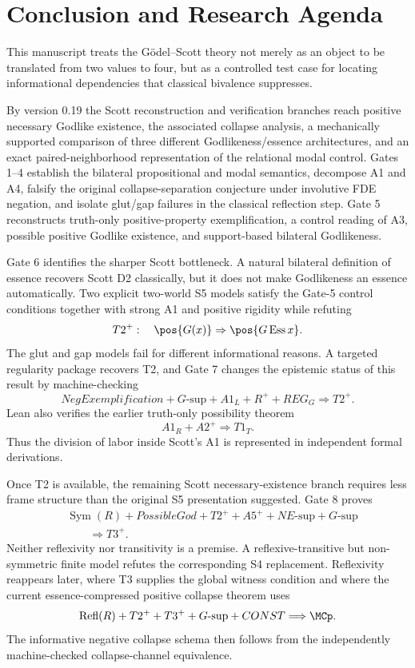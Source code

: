 \section{Conclusion and Research Agenda}
\label{sec:conclusion}

This manuscript treats the G\"odel--Scott theory not merely as an object to be translated from two values to four, but as a controlled test case for locating informational dependencies that classical bivalence suppresses.

By version 0.19 the Scott reconstruction and verification branches reach positive necessary Godlike existence, the associated collapse analysis, a mechanically supported comparison of three different Godlikeness/essence architectures, and an exact paired-neighborhood representation of the relational modal control. Gates 1--4 establish the bilateral propositional and modal semantics, decompose A1 and A4, falsify the original collapse-separation conjecture under involutive FDE negation, and isolate glut/gap failures in the classical reflection step. Gate 5 reconstructs truth-only positive-property exemplification, a control reading of A3, possible positive Godlike existence, and support-based bilateral Godlikeness.

Gate 6 identifies the sharper Scott bottleneck. A natural bilateral definition of essence recovers Scott D2 classically, but it does not make Godlikeness an essence automatically. Two explicit two-world S5 models satisfy the Gate-5 control conditions together with strong A1 and positive rigidity while refuting
\[
  T2^+:\quad
  \pos{G(x)}\Rightarrow\pos{G\operatorname{Ess}x}.
\]
The glut and gap models fail for different informational reasons. A targeted regularity package recovers T2, and Gate 7 changes the epistemic status of this result by machine-checking
\[
  NegExemplification
  +G\text{-sup}
  +A1_L
  +R^+
  +REG_G
  \Longrightarrow T2^+.
\]
Lean also verifies the earlier truth-only possibility theorem
\[
  A1_R+A2^+\Longrightarrow T1_T.
\]
Thus the division of labor inside Scott's A1 is represented in independent formal derivations.

Once T2 is available, the remaining Scott necessary-existence branch requires less frame structure than the original S5 presentation suggested. Gate 8 proves
\[
\begin{split}
  &\operatorname{Sym}(R)
  +PossibleGod
  +T2^+
  +A5^+
  +NE\text{-sup}
  +G\text{-sup}\\
  &\qquad\Longrightarrow T3^+.
\end{split}
\]
Neither reflexivity nor transitivity is a premise. A reflexive-transitive but non-symmetric finite model refutes the corresponding S4 replacement. Reflexivity reappears later, where T3 supplies the global witness condition and where the current essence-compressed positive collapse theorem uses
\[
  \operatorname{Refl}(R)+T2^++T3^++G\text{-sup}+CONST
  \Longrightarrow\MCp.
\]
The informative negative collapse schema then follows from the independently machine-checked collapse-channel equivalence.


